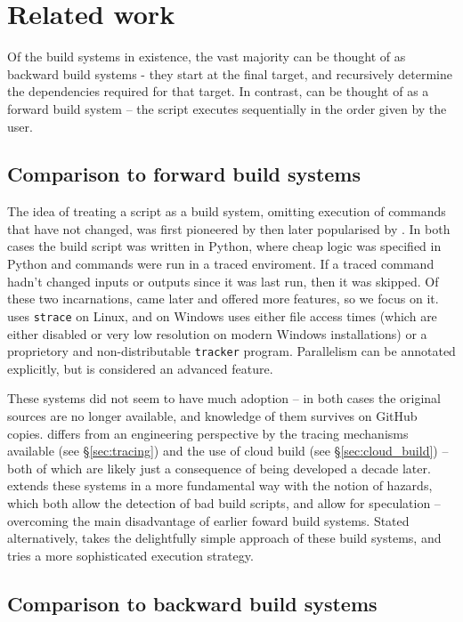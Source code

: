 \section{Related work}
\label{sec:related}

Of the build systems in existence, the vast majority can be thought of as backward build systems - they start at the final target, and recursively determine the dependencies required for that target. In contrast, \Rattle can be thought of as a forward build system -- the script executes sequentially in the order given by the user.

\subsection{Comparison to forward build systems}

The idea of treating a script as a build system, omitting execution of commands that have not changed, was first pioneered by \Memoize \cite{memoize} then later popularised by \Fabricate \cite{fabricate}. In both cases the build script was written in Python, where cheap logic was specified in Python and commands were run in a traced enviroment. If a traced command hadn't changed inputs or outputs since it was last run, then it was skipped. Of these two incarnations, \Fabricate came later and offered more features, so we focus on it. \Fabricate uses \texttt{strace} on Linux, and on Windows uses either file access times (which are either disabled or very low resolution on modern Windows installations) or a proprietory and non-distributable \texttt{tracker} program. Parallelism can be annotated explicitly, but is considered an advanced feature.

These systems did not seem to have much adoption -- in both cases the original sources are no longer available, and knowledge of them survives on GitHub copies. \Rattle differs from an engineering perspective by the tracing mechanisms available (see \S\ref{sec:tracing}) and the use of cloud build (see \S\ref{sec:cloud_build}) -- both of which are likely just a consequence of being developed a decade later. \Rattle extends these systems in a more fundamental way with the notion of hazards, which both allow the detection of bad build scripts, and allow for speculation -- overcoming the main disadvantage of earlier foward build systems. Stated alternatively, \Rattle takes the delightfully simple approach of these build systems, and tries a more sophisticated execution strategy.

\subsection{Comparison to backward build systems}

